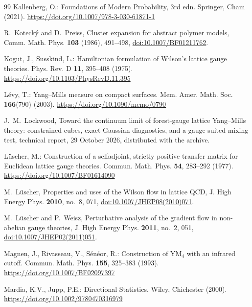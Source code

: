\documentclass[11pt]{amsart}
\theoremstyle{definition}
\theoremstyle{remark}
\numberwithin{equation}{section}
\begin{document}
\begin{thebibliography}{99}
Kallenberg, O.: Foundations of Modern Probability, 3rd edn. Springer, Cham
(2021).
\href{https://doi.org/10.1007/978-3-030-61871-1}{https://doi.org/10.1007/978-3-030-61871-1}

R.~Koteck\'y and D.~Preiss, Cluster expansion for abstract polymer models,
Comm. Math. Phys. \textbf{103} (1986), 491--498,
\href{https://doi.org/10.1007/BF01211762}{doi:10.1007/BF01211762}.

Kogut, J., Susskind, L.: Hamiltonian formulation of Wilson's lattice gauge
theories. Phys. Rev. D \textbf{11}, 395--408 (1975).
\href{https://doi.org/10.1103/PhysRevD.11.395}{https://doi.org/10.1103/PhysRevD.11.395}

L\'evy, T.: Yang--Mills measure on compact surfaces. Mem. Amer. Math. Soc. \textbf{166}(790) (2003). \href{https://doi.org/10.1090/memo/0790}{https://doi.org/10.1090/memo/0790}

J.~M.~Lockwood, Toward the continuum limit of forest-gauge lattice
Yang--Mills theory: constrained cubes, exact Gaussian diagnostics, and a
gauge-suited mixing test, technical report, 29 October 2026, distributed with
the archive.

L\"uscher, M.: Construction of a selfadjoint, strictly positive transfer
matrix for Euclidean lattice gauge theories. Commun. Math. Phys. \textbf{54},
283--292 (1977).
\href{https://doi.org/10.1007/BF01614090}{https://doi.org/10.1007/BF01614090}

M.~L\"uscher, Properties and uses of the Wilson flow in lattice QCD, J. High
Energy Phys. \textbf{2010}, no.~8, 071,
\href{https://doi.org/10.1007/JHEP08(2010)071}{doi:10.1007/JHEP08(2010)071}.

M.~L\"uscher and P.~Weisz, Perturbative analysis of the gradient flow in
non-abelian gauge theories, J. High Energy Phys. \textbf{2011}, no.~2, 051,
\href{https://doi.org/10.1007/JHEP02(2011)051}{doi:10.1007/JHEP02(2011)051}.

Magnen, J., Rivasseau, V., S\'en\'eor, R.: Construction of YM$_4$ with an infrared cutoff. Commun. Math. Phys. \textbf{155}, 325--383 (1993). \href{https://doi.org/10.1007/BF02097397}{https://doi.org/10.1007/BF02097397}

Mardia, K.V., Jupp, P.E.: Directional Statistics. Wiley, Chichester (2000). \href{https://doi.org/10.1002/9780470316979}{https://doi.org/10.1002/9780470316979}


\end{thebibliography}
\end{document}
